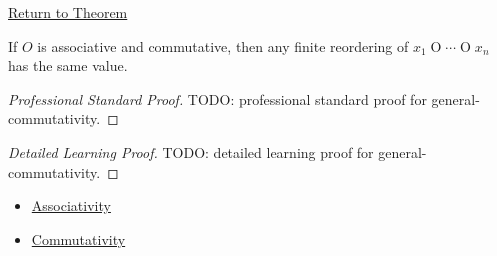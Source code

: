 \newpage
{}
\label{prf:general-commutativity}

\begin{remark*}[Return]
\hyperref[thm:general-commutativity]{Return to Theorem}
\end{remark*}

\begin{theorem*}
If $O$ is associative and commutative, then any finite reordering of
$x_1\mathbin{O}\cdots\mathbin{O}x_n$ has the same value.
\end{theorem*}

\begin{proof}[Professional Standard Proof]
\LRAProofBodyStart
TODO: professional standard proof for general-commutativity.
\end{proof}

\begin{proof}[Detailed Learning Proof]
\LRAProofBodyStart
TODO: detailed learning proof for general-commutativity.
\end{proof}

\begin{remark*}
\end{remark*}

\begin{dependencies}
\begin{itemize}
  \item \hyperref[def:associativity]{Associativity}
  \item \hyperref[def:commutativity]{Commutativity}
\end{itemize}
\end{dependencies}

\clearpage
